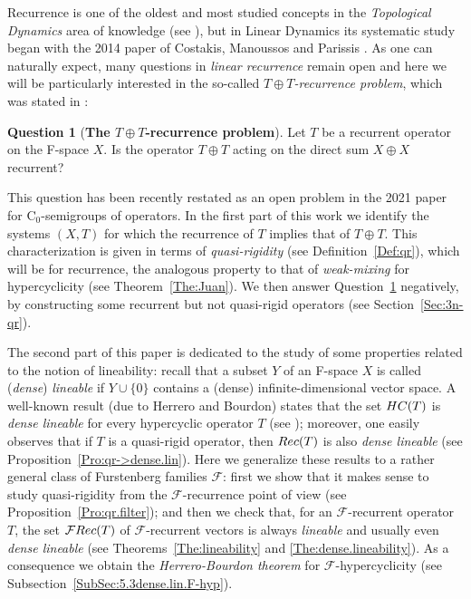 \documentclass[openright,11pt]{article}
\theoremstyle{plain}
\theoremstyle{definition}
\newtheorem{question}[theorem]{Question}
\newcommand{\Fc}{\mathcal{F}}
\newcommand{\Rec}{\textup{Rec}}
\newcommand{\HC}{\textup{HC}}
\begin{document}
Recurrence is one of the oldest and most studied concepts in the {\em Topological Dynamics} area of knowledge (see \cite{Furstenberg1981_book,Banks1999,KwiLiOpYe2017}), but in Linear Dynamics its systematic study began with the 2014 paper of Costakis, Manoussos and Parissis \cite{CoMaPa2014}. As one can naturally expect, many questions in {\em linear recurrence} remain open and here we will be particularly interested in the so-called {\em $T\oplus T$-recurrence problem}, which was stated in \cite[Question~9.6]{CoMaPa2014}:

\begin{question}[\textbf{The $T\oplus T$-recurrence problem}]\label{Q:T+T-rec}
	Let $T$ be a recurrent operator on the F-space $X$. Is the operator $T\oplus T$ acting on the direct sum $X\oplus X$ recurrent?
\end{question}

This question has been recently restated as an open problem in the 2021 paper \cite{ChenKosVe2021} for C$_0$-semigroups of operators. In the first part of this work we identify the systems $(X,T)$ for which the recurrence of $T$ implies that of $T\oplus T$. This characterization is given in terms of {\em quasi-rigidity} (see Definition~\ref{Def:qr}), which will be for recurrence, the analogous property to that of {\em weak-mixing} for hypercyclicity (see Theorem~\ref{The:Juan}). We then answer Question~\ref{Q:T+T-rec} negatively, by constructing some recurrent but not quasi-rigid operators (see Section~\ref{Sec:3n-qr}).%

The second part of this paper is dedicated to the study of some properties related to the notion of lineability: recall that a subset $Y$ of an F-space $X$ is called ({\em dense}) {\em lineable} if $Y\cup\{0\}$ contains a (dense) infinite-dimensional vector space. A well-known result (due to Herrero and Bourdon) states that the set $\HC(T)$ is {\em dense lineable} for every hypercyclic operator $T$ (see \cite[Theorem 2.55]{GrPe2011_book}); moreover, one easily observes that if $T$ is a quasi-rigid operator, then $\Rec(T)$ is also {\em dense lineable} (see Proposition~\ref{Pro:qr->dense.lin}). Here we generalize these results to a rather general class of Furstenberg families $\Fc$: first we show that it makes sense to study quasi-rigidity from the $\Fc$-recurrence point of view (see Proposition~\ref{Pro:qr.filter}); and then we check that, for an $\Fc$-recurrent operator $T$, the set $\Fc\Rec(T)$ of $\Fc$-recurrent vectors is always {\em lineable} and usually even {\em dense lineable} (see Theorems~\ref{The:lineability} and \ref{The:dense.lineability}). As a consequence we obtain the {\em Herrero-Bourdon theorem} for $\Fc$-hypercyclicity (see Subsection~\ref{SubSec:5.3dense.lin.F-hyp}).\\[-5pt]
\end{document}
